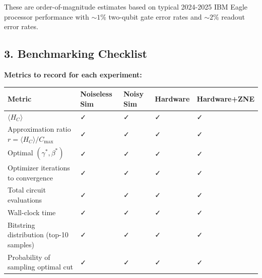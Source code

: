 \documentclass[
  11pt,
]{report}
\newcounter{none} %
\begin{document}
These are order-of-magnitude estimates based on typical 2024-2025 IBM
Eagle processor performance with \(\sim 1\%\) two-qubit gate error rates
and \(\sim 2\%\) readout error rates.

\subsection{3. Benchmarking Checklist}\label{benchmarking-checklist}

\textbf{Metrics to record for each experiment:}

{\def\LTcaptype{none} %
\begin{longtable}[]{@{}
  >{\raggedright\arraybackslash}p{}
  >{\centering\arraybackslash}p{}
  >{\centering\arraybackslash}p{}
  >{\centering\arraybackslash}p{}
  >{\centering\arraybackslash}p{}@{}}
\toprule\noalign{}
\begin{minipage}[b]{\linewidth}\raggedright
Metric
\end{minipage} & \begin{minipage}[b]{\linewidth}\centering
Noiseless Sim
\end{minipage} & \begin{minipage}[b]{\linewidth}\centering
Noisy Sim
\end{minipage} & \begin{minipage}[b]{\linewidth}\centering
Hardware
\end{minipage} & \begin{minipage}[b]{\linewidth}\centering
Hardware+ZNE
\end{minipage} \\
\midrule\noalign{}
\endhead
\bottomrule\noalign{}
\endlastfoot
\(\langle H_C \rangle\) & ✓ & ✓ & ✓ & ✓ \\
Approximation ratio \(r = \langle H_C \rangle / C_{\max}\) & ✓ & ✓ & ✓ &
✓ \\
Optimal \((\gamma^*, \beta^*)\) & ✓ & ✓ & ✓ & ✓ \\
Optimizer iterations to convergence & ✓ & ✓ & ✓ & ✓ \\
Total circuit evaluations & ✓ & ✓ & ✓ & ✓ \\
Wall-clock time & ✓ & ✓ & ✓ & ✓ \\
Bitstring distribution (top-10 samples) & ✓ & ✓ & ✓ & ✓ \\
Probability of sampling optimal cut & ✓ & ✓ & ✓ & ✓ \\
\end{longtable}
}
\end{document}
